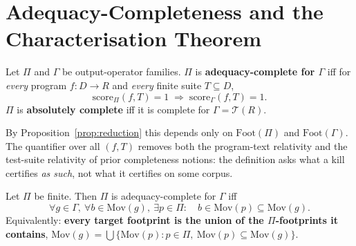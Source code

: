 \documentclass[runningheads,envcountsect,envcountsame]{llncs}
\newcommand{\Mov}{\mathrm{Mov}}
\newcommand{\Foot}{\mathrm{Foot}}
\newcommand{\score}{\mathrm{score}}
\newcommand{\TR}{\mathcal{T}(R)}
\begin{document}
\section{Adequacy-Completeness and the Characterisation Theorem}
\label{sec:char}

\begin{definition}
\label{def:complete}
Let $\Pi$ and $\Gamma$ be output-operator families. $\Pi$ is
\textbf{adequacy-complete for $\Gamma$} iff for \emph{every} program
$f : D \to R$ and \emph{every} finite suite $T \subseteq D$,
\[
  \score_\Pi(f,T) = 1 \;\Longrightarrow\; \score_\Gamma(f,T) = 1.
\]
$\Pi$ is \textbf{absolutely complete} iff it is complete for $\Gamma = \TR$.
\end{definition}

By Proposition~\ref{prop:reduction} this depends only on $\Foot(\Pi)$ and
$\Foot(\Gamma)$. The quantifier over all $(f,T)$ removes both the program-text
relativity and the test-suite relativity of prior completeness notions: the
definition asks what a kill certifies \emph{as such}, not what it certifies on
some corpus.

\begin{theorem}
\label{thm:char}
Let $\Pi$ be finite. Then $\Pi$ is adequacy-complete for $\Gamma$ iff
\[
  \forall g \in \Gamma,\ \forall b \in \Mov(g),\ \exists p \in \Pi :\quad
  b \in \Mov(p) \subseteq \Mov(g).
\]
Equivalently: \textbf{every target footprint is the union of the
$\Pi$-footprints it contains},
$\Mov(g) = \bigcup \{\Mov(p) : p \in \Pi,\ \Mov(p) \subseteq \Mov(g)\}$.
\end{theorem}
\end{document}
